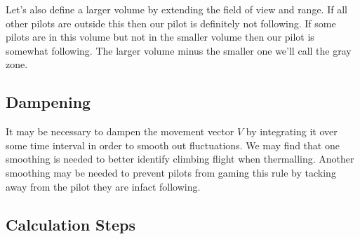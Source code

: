 \documentclass[gap.tex]{subfiles}
\begin{document}
Let's also define a larger volume by extending the field of view and range. If
all other pilots are outside this then our pilot is definitely not following.
If some pilots are in this volume but not in the smaller volume then our pilot
is somewhat following. The larger volume minus the smaller one we'll call the
gray zone.

\subsection{Dampening}
It may be necessary to dampen the movement vector \(V\) by integrating it over
some time interval in order to smooth out fluctuations. We may find that one
smoothing is needed to better identify climbing flight when thermalling.
Another smoothing may be needed to prevent pilots from gaming this rule by
tacking away from the pilot they are infact following.

\subsection{Calculation Steps}
\end{document}
